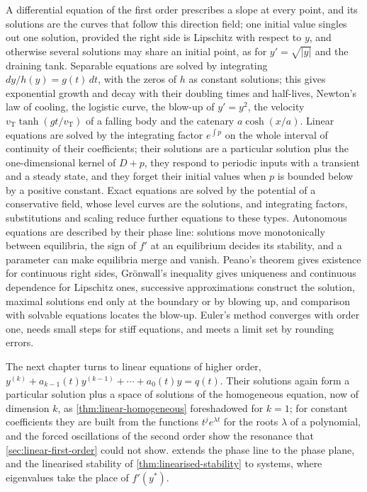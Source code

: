 \bigskip
A differential equation of the first order prescribes a slope at every point, and its solutions are the curves that follow this direction field; one initial value singles out one solution, provided the right side is Lipschitz with respect to $y$, and otherwise several solutions may share an initial point, as for $y'=\sqrt{|y|}$ and the draining tank. Separable equations are solved by integrating $dy/h(y)=g(t)\,dt$, with the zeros of $h$ as constant solutions; this gives exponential growth and decay with their doubling times and half-lives, Newton's law of cooling, the logistic curve, the blow-up of $y'=y^2$, the velocity $v_{\mathrm T}\tanh(gt/v_{\mathrm T})$ of a falling body and the catenary $a\cosh(x/a)$. Linear equations are solved by the integrating factor $e^{\int p}$ on the whole interval of continuity of their coefficients; their solutions are a particular solution plus the one-dimensional kernel of $D+p$, they respond to periodic inputs with a transient and a steady state, and they forget their initial values when $p$ is bounded below by a positive constant. Exact equations are solved by the potential of a conservative field, whose level curves are the solutions, and integrating factors, substitutions and scaling reduce further equations to these types. Autonomous equations are described by their phase line: solutions move monotonically between equilibria, the sign of $f'$ at an equilibrium decides its stability, and a parameter can make equilibria merge and vanish. Peano's theorem gives existence for continuous right sides, Gr\"onwall's inequality gives uniqueness and continuous dependence for Lipschitz ones, successive approximations construct the solution, maximal solutions end only at the boundary or by blowing up, and comparison with solvable equations locates the blow-up. Euler's method converges with order one, needs small steps for stiff equations, and meets a limit set by rounding errors.

The next chapter turns to linear equations of higher order, $y^{(k)}+a_{k-1}(t)y^{(k-1)}+\cdots+a_0(t)y=q(t)$. Their solutions again form a particular solution plus a space of solutions of the homogeneous equation, now of dimension $k$, as \cref{thm:linear-homogeneous} foreshadowed for $k=1$; for constant coefficients they are built from the functions $t^je^{\lambda t}$ for the roots $\lambda$ of a polynomial, and the forced oscillations of the second order show the resonance that \cref{sec:linear-first-order} could not show.  extends the phase line to the phase plane, and the linearised stability of \cref{thm:linearised-stability} to systems, where eigenvalues take the place of $f'(y^*)$.

